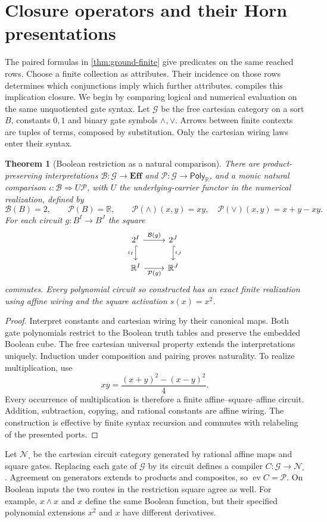 \documentclass[11pt,a4paper]{article}
\newtheorem{theorem}{Theorem}[section]
\theoremstyle{definition}
\theoremstyle{remark}\newaliascnt{remark}{theorem}
\newcommand{\E}{\mathbf{Eff}}
\newcommand{\R}{\mathbb R}
\newcommand{\ev}{\operatorname{ev}}
\newcommand{\NN}{\mathcal N}
\numberwithin{equation}{section}
\begin{document}
\section{Closure operators and their Horn presentations}\label{sec:early-horn}
The paired formulas in \cref{thm:ground-finite} give predicates on the same reached rows. Choose a finite collection as attributes. Their incidence on those rows determines which conjunctions imply which further attributes.  compiles this implication closure. We begin by comparing logical and numerical evaluation on the same unquotiented gate syntax. Let \(\mathcal G\) be the free cartesian category on a sort \(B\), constants \(0,1\) and binary gate symbols \(\wedge,\vee\). Arrows between finite contexts are tuples of terms, composed by substitution. Only the cartesian wiring laws enter their syntax.
\begin{theorem}[Boolean restriction as a natural comparison]\label{neural:thm:boolean-comparison}
There are product-preserving interpretations $\mathcal B:\mathcal G\to\E$ and $\mathcal P:\mathcal G\to\mathsf{Poly}_{\R}$, and a monic natural comparison $\iota:\mathcal B\Rightarrow U\mathcal P$, with $U$ the underlying-carrier functor in the numerical realization, defined by
\[
 \mathcal B(B)=2,\qquad \mathcal P(B)=\R,\qquad
 \mathcal P(\wedge)(x,y)=xy,\quad
 \mathcal P(\vee)(x,y)=x+y-xy.
\]
For each circuit $g:B^I\to B^J$ the square
\[
\begin{tikzcd}
2^I \arrow[r,"\mathcal B(g)"] \arrow[d,hook,"\iota_I"'] & 2^J \arrow[d,hook,"\iota_J"]\\
\R^I \arrow[r,"\mathcal P(g)"'] & \R^J
\end{tikzcd}
\]
commutes. Every polynomial circuit so constructed has an exact finite realization using affine wiring and the square activation $s(x)=x^2$.
\end{theorem}
\begin{proof}
Interpret constants and cartesian wiring by their canonical maps. Both gate polynomials restrict to the Boolean truth tables and preserve the embedded Boolean cube. The free cartesian universal property extends the interpretations uniquely. Induction under composition and pairing proves naturality. To realize multiplication, use
\[
 xy=\frac{(x+y)^2-(x-y)^2}{4}.
\]
Every occurrence of multiplication is therefore a finite affine--square--affine circuit. Addition, subtraction, copying, and rational constants are affine wiring. The construction is effective by finite syntax recursion and commutes with relabeling of the presented ports.
\end{proof}
Let $\NN_\square$ be the cartesian circuit category generated by rational affine maps and square gates. Replacing each gate of $\mathcal G$ by its circuit defines a compiler $C:\mathcal G\to\NN_\square$. Agreement on generators extends to products and composites, so $\ev C=\mathcal P$. On Boolean inputs the two routes in the restriction square agree as well. For example, $x\wedge x$ and $x$ define the same Boolean function, but their specified polynomial extensions $x^2$ and $x$ have different derivatives.
\end{document}
